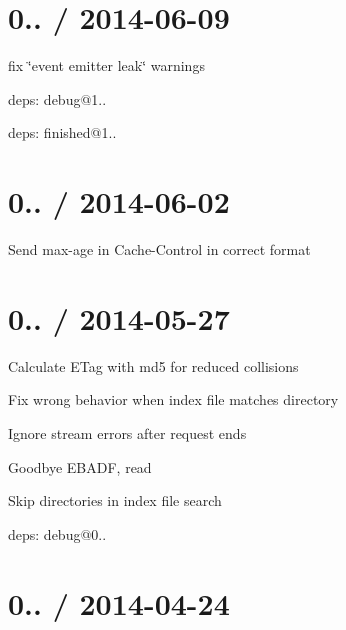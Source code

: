 \section*{0.. / 2014-\/06-\/09 }


\begin{DoxyItemize}
\item fix \char`\"{}event emitter leak\char`\"{} warnings
\item deps\+: debug@1..
\item deps\+: finished@1..
\end{DoxyItemize}

\section*{0.. / 2014-\/06-\/02 }


\begin{DoxyItemize}
\item Send {\ttfamily max-\/age} in {\ttfamily Cache-\/\+Control} in correct format
\end{DoxyItemize}

\section*{0.. / 2014-\/05-\/27 }


\begin{DoxyItemize}
\item Calculate E\+Tag with md5 for reduced collisions
\item Fix wrong behavior when index file matches directory
\item Ignore stream errors after request ends
\begin{DoxyItemize}
\item Goodbye {\ttfamily E\+B\+A\+DF, read}
\end{DoxyItemize}
\item Skip directories in index file search
\item deps\+: debug@0..
\end{DoxyItemize}

\section*{0.. / 2014-\/04-\/24 }


